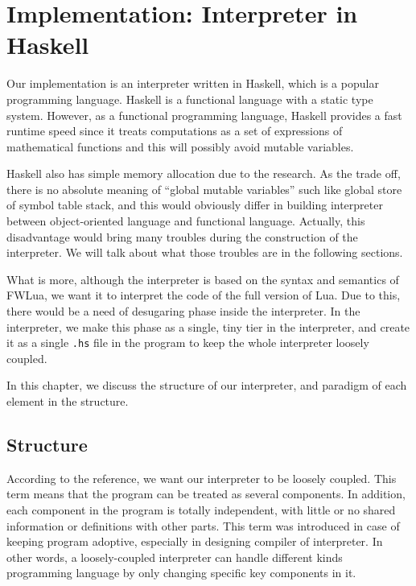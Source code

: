 \chapter{Implementation: Interpreter in Haskell}
Our implementation is an interpreter written in Haskell, which is a popular programming language. Haskell is a functional language with a static type system.
However, as a functional programming language, Haskell provides a fast runtime speed since it treats computations as a set of expressions of mathematical functions and this will possibly avoid mutable variables. 

Haskell also has simple memory allocation due to the research\cite{PIH}. As the trade off, there is no absolute meaning of ``global mutable variables'' such like global store of symbol table stack, and this would obviously differ in building interpreter between object-oriented language and functional language. Actually, this disadvantage would bring many troubles during the construction of the interpreter. We will talk about what those troubles are in the following sections.

What is more, although the interpreter is based on the syntax and semantics of FWLua, we want it to interpret the code of the full version of Lua. Due to this, there would be a need of desugaring phase inside the interpreter. In the interpreter, we make this phase as a single, tiny tier in the interpreter, and create it as a single {\tt .hs} file in the program to keep the whole interpreter loosely coupled.

In this chapter, we discuss the structure of our interpreter, and paradigm of each element in the structure.

\section{Structure}
According to the reference\cite{WCAI}, we want our interpreter to be loosely coupled\cite{looseC}. This term means that the program can be treated as several components. In addition, each component in the program is totally independent, with little or no shared information or definitions with other parts.
This term was introduced in case of keeping program adoptive, especially in designing compiler of interpreter. In other words, a loosely-coupled interpreter can handle different kinds programming language by only changing specific key components in it.


